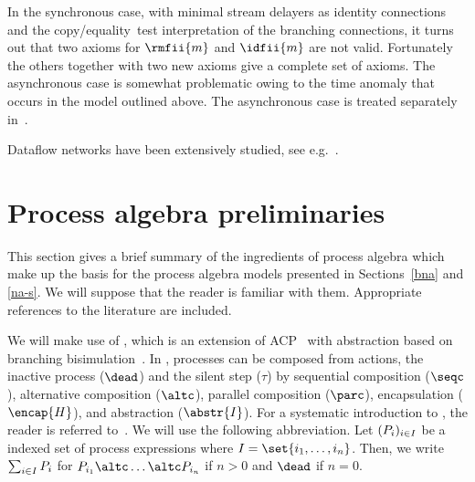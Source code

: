 \documentclass[fleqn]{llncs}
\begin{document}
In the synchronous case, with minimal stream delayers as identity
connections and the copy/equality~test interpretation of the branching
connections, it turns out that two axioms for $\rmfii{m}$ and 
$\idfii{m}$ are not valid.
Fortunately the others together with two new axioms give a complete set 
of axioms.
The asynchronous case is somewhat problematic owing to the time anomaly
that occurs in the model outlined above.
The asynchronous case is treated separately in~\cite{BMS97a}.

Dataflow networks have been extensively studied, see
e.g.~\cite{BWM94,Boh84,BA81,Bro88,Jon89,Kah74,Kok87,Rus89}.

\section{Process algebra preliminaries}
\label{preliminaries}
This section gives a brief summary of the ingredients of process
algebra which make up the basis for the process algebra models
presented in Sections~\ref{bna} and \ref{na-s}.
We will suppose that the reader is familiar with them.
Appropriate references to the literature are included.

We will make use of \acpt, which is an extension of ACP~\cite{BK84b} 
with abstraction based on branching bisimulation~\cite{GW96}.
In \acpt, processes can be composed from actions, the inactive process 
($\dead$) and the silent step ($\tau$) by sequential composition 
($\seqc$), alternative composition ($\altc$), parallel composition 
($\parc$), encapsulation ($\encap{H}$), and abstraction ($\abstr{I}$).
For a systematic introduction to \acpt, the reader is referred
to~\cite{BW90}.
We will use the following abbreviation.
Let $(P\sb{i})\sb{i \in I}$ be a indexed set of process expressions
where $I = \set{i\sb1,\ldots,i\sb{n}}$.
Then, we write $\sum_{i \in I} P\sb{i}$ for
$P\sb{i\sb1} \altc \ldots \altc P\sb{i\sb{n}}$ if $n > 0$ and $\dead$
if $n = 0$.
\end{document}
